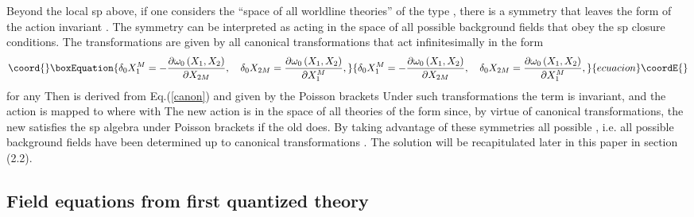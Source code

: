 \documentclass[a4paper,12pt]{article}
\begin{document}
Beyond the local sp\coordHE{} above, if one considers the ``space
of all worldline theories'' of the type \coordHE{}, there is a symmetry that
leaves the form of the action invariant \cite{highspin}. The symmetry can be
interpreted as acting in the space of all possible background fields \coordHE{} that obey the sp\coordHE{} closure conditions. The transformations are given by all
canonical transformations that act infinitesimally in the form 
\begin{equation}\coord{}\boxEquation{
\delta _{0}X_{1}^{M}=-\frac{\partial \omega _{0}\left( X_{1},X_{2}\right) }{
\partial X_{2M}},\quad \delta _{0}X_{2M}=\frac{\partial \omega _{0}\left(
X_{1},X_{2}\right) }{\partial X_{1}^{M}},  \label{canon}
}{
\delta _{0}X_{1}^{M}=-\frac{\partial \omega _{0}\left( X_{1},X_{2}\right) }{
\partial X_{2M}},\quad \delta _{0}X_{2M}=\frac{\partial \omega _{0}\left(
X_{1},X_{2}\right) }{\partial X_{1}^{M}},  }{ecuacion}\coordE{}\end{equation}
for any \coordHE{} Then \coordHE{} is
derived from Eq.(\ref{canon}) and given by the Poisson brackets \coordHE{} Under such transformations
the term \coordHE{} is invariant, and the action \coordHE{}
is mapped to \coordHE{} where \coordHE{} with \coordHE{} The new action \coordHE{} is in the space
of all theories of the form \coordHE{} since, by virtue of canonical
transformations, the new \coordHE{} satisfies the sp\coordHE{} algebra under Poisson brackets if the old \coordHE{} does. By taking
advantage of these symmetries all possible \coordHE{}%
, i.e. all possible background fields have been determined up to canonical
transformations \cite{highspin}. The solution will be recapitulated later in
this paper in section (2.2).

\subsection{Field equations from first quantized theory}
\end{document}
